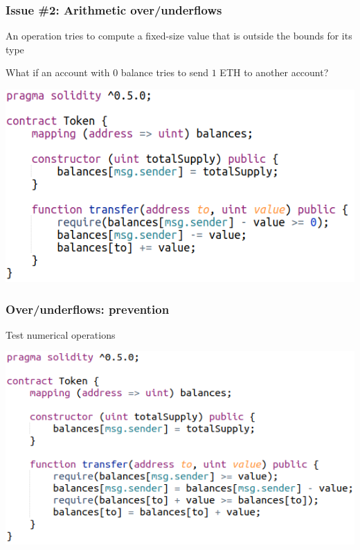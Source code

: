 \documentclass[11pt]{beamer}  %
\begin{document}
\begin{frame}\frametitle{Issue \#2: Arithmetic over/underflows}

  \begin{redbox}{}
    An operation tries to compute a fixed-size value that is outside the
    bounds for its type
  \end{redbox}

  \bigskip

  \begin{greenbox}{What if an account with $0$ balance tries to send $1$ ETH to another account?}
    \begin{center}
      \includegraphics[scale=0.5,clip=false]{pictures/under-overflow.png}
    \end{center}
  \end{greenbox}
  
\end{frame}

\begin{frame}\frametitle{Over/underflows: prevention}

  \begin{greenbox}{Test numerical operations}
    \begin{center}
      \includegraphics[scale=0.45,clip=false]{pictures/under-overflow-fixed-check.png}
    \end{center}
  \end{greenbox}
    
\end{frame}
\end{document}
